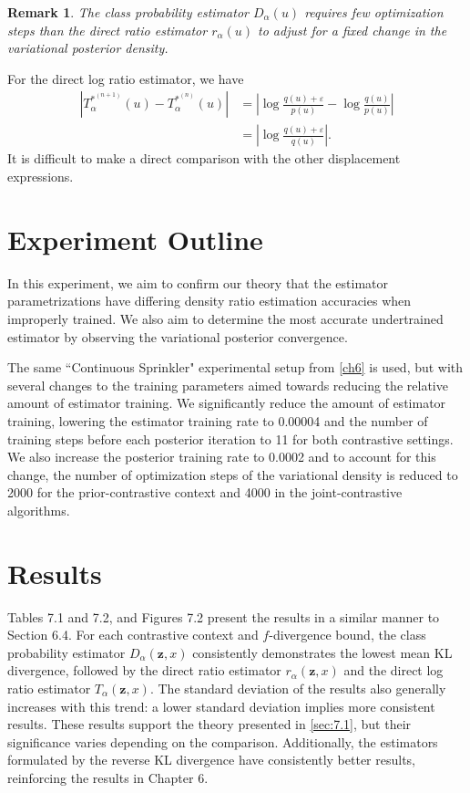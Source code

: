 \documentclass[honours,12pt, twoside]{unswthesis}
\newtheorem{remark}[theorem]{Remark}
\numberwithin{equation}{section}
\theoremstyle{definition}
\begin{document}
\begin{remark}
The class probability estimator $D_\alpha(u)$ requires few optimization steps than the direct ratio estimator $r_\alpha(u)$ to adjust for a fixed change in the variational posterior density.
\end{remark}
For the direct log ratio estimator, we have
\begin{align*}
|T^{*^{(n+1)}}_\alpha(u)-T^{*^{(n)}}_\alpha(u)|&=\left|\log \frac{q(u)+\varepsilon}{p(u)}-\log \frac{q(u)}{p(u)}\right|\\
&=\left|\log \frac{q(u)+\varepsilon}{q(u)}\right|.
\end{align*}
It is difficult to make a direct comparison with the other displacement expressions.

\section{Experiment Outline}
In this experiment, we aim to confirm our theory that the estimator parametrizations have differing density ratio estimation accuracies when improperly trained. We also aim to determine the most accurate undertrained estimator by observing the variational posterior convergence.

The same ``Continuous Sprinkler" experimental setup from \autoref{ch6} is used, but with several changes to the training parameters aimed towards reducing the relative amount of estimator training. We significantly reduce the amount of estimator training, lowering the estimator training rate to 0.00004 and the number of training steps before each posterior iteration to 11 for both contrastive settings. We also increase the posterior training rate to 0.0002 and to account for this change, the number of optimization steps of the variational density is reduced to 2000 for the prior-contrastive context and 4000 in the joint-contrastive algorithms. 
\section{Results}
Tables 7.1 and 7.2, and Figures 7.2 present the results in a similar manner to Section 6.4. For each contrastive context and $f$-divergence bound, the class probability estimator $D_\alpha(\bm{z},x)$ consistently demonstrates the lowest mean KL divergence, followed by the direct ratio estimator $r_\alpha (\bm{z},x)$ and the direct log ratio estimator $T_\alpha(\bm{z},x)$. The standard deviation of the results also generally increases with this trend: a lower standard deviation implies more consistent results. These results support the theory presented in \autoref{sec:7.1}, but their significance varies depending on the comparison. Additionally, the estimators formulated by the reverse KL divergence have consistently better results, reinforcing the results in Chapter 6.
\end{document}
